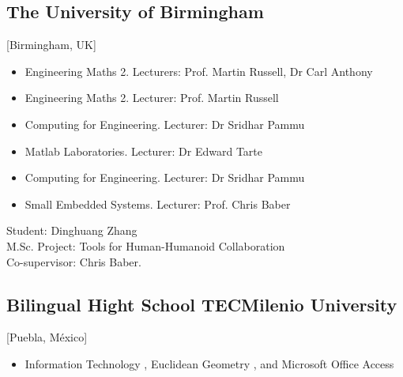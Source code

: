 \documentclass{mycv}
\begin{document}
\subsection{The University of Birmingham}[Birmingham, UK]
\begin{positions}
\end{positions}
\begin{itemize}
	\item Engineering Maths 2. Lecturers: Prof. Martin Russell, Dr Carl Anthony 
	\item Engineering Maths 2. Lecturer: Prof. Martin Russell 
	\item Computing for Engineering. Lecturer: Dr Sridhar Pammu  
	\item Matlab Laboratories. Lecturer: Dr Edward Tarte  
	\item Computing for Engineering. Lecturer: Dr Sridhar Pammu  
	\item Small Embedded Systems. Lecturer: Prof. Chris Baber   \\
\end{itemize}

 \newpage
\begin{positions}
\end{positions}
Student: Dinghuang Zhang \\
M.Sc. Project: Tools for Human-Humanoid Collaboration \\
Co-supervisor: Chris Baber. 

\subsection{Bilingual Hight School TECMilenio University}[Puebla, M\'exico]
\begin{positions}
\end{positions}
\begin{itemize}
	\item
	Information Technology \href{https://sites.google.com/site/perezxochicale/teaching/iit}{\faExternalLink}, 
	Euclidean Geometry  \href{https://sites.google.com/site/perezxochicale/teaching/euclidean-geometry}{\faExternalLink}, and 
	Microsoft Office Access \href{https://sites.google.com/site/perezxochicale/teaching/moa}{\faExternalLink}
\end{itemize}
\end{document}
